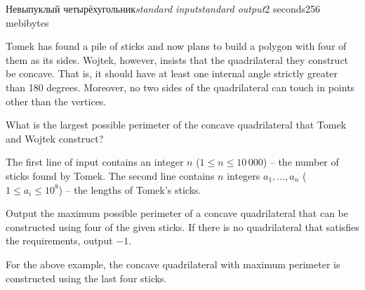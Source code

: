 \begin{problem}{Невыпуклый четырёхугольник}{\textsl{standard input}}{\textsl{standard output}}{2 seconds}{256 mebibytes}

  Tomek has found a pile of sticks and now plans to build a polygon with four of them as its sides.
  Wojtek, however, insists that the quadrilateral they construct be concave.
  That is, it should have at least one internal angle strictly greater than 180 degrees.
  Moreover, no two sides of the quadrilateral can touch in points other than the vertices.

  What is the largest possible perimeter of the concave quadrilateral that Tomek and Wojtek construct?

\InputFile
  The first line of input contains an integer $n$ ($1 \leq n \leq 10\,000$) -- the number of sticks found by Tomek.
  The second line contains $n$ integers $a_1, \ldots, a_n$ ($1 \leq a_i \leq 10^8$) -- the lengths of Tomek's sticks.

\OutputFile
  Output the maximum possible perimeter of a concave quadrilateral that can be constructed using four of the given sticks.
  If there is no quadrilateral that satisfies the requirements, output $-1$.

\Examples
\begin{example}
%
\end{example}

\Note
    For the above example, the concave quadrilateral with maximum perimeter is constructed using the last four sticks.
\end{problem}
